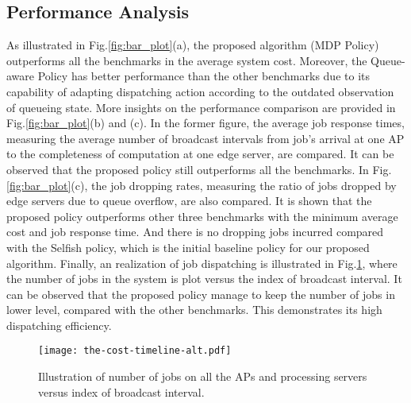 \subsection{Performance Analysis}
\label{subsec:basic}
As illustrated in Fig.\ref{fig:bar_plot}(a), the proposed algorithm (MDP Policy) outperforms all the benchmarks in the average system cost.
Moreover, the Queue-aware Policy has better performance than the other benchmarks due to its capability of adapting dispatching action according to the outdated observation of queueing state.
More insights on the performance comparison are provided in Fig.\ref{fig:bar_plot}(b) and (c).
In the former figure, the average job response times, measuring the average number of broadcast intervals from job's arrival at one AP to the completeness of computation at one edge server, are compared.
It can be observed that the proposed policy still outperforms all the benchmarks.
In Fig.\ref{fig:bar_plot}(c), the job dropping rates, measuring the ratio of jobs dropped by edge servers due to queue overflow, are also compared.
It is shown that the proposed policy outperforms other three benchmarks with the minimum average cost and job response time.
And there is no dropping jobs incurred compared with the Selfish policy, which is the initial baseline policy for our proposed algorithm.
Finally, an realization of job dispatching is illustrated in Fig.\ref{fig:general_timeline}, where the number of jobs in the system is plot versus the index of broadcast interval.
It can be observed that the proposed policy manage to keep the number of jobs in lower level, compared with the other benchmarks.
This demonstrates its high dispatching efficiency.

\begin{figure}[ht!]                                                                             %
    \centering                                                                                  %
    \texttt{[image: the-cost-timeline-alt.pdf]}                     %
    \caption{Illustration of number of jobs on all the APs and processing servers versus index of broadcast interval.}
    \label{fig:general_timeline}                                                                %
\end{figure}                                                                                    %

